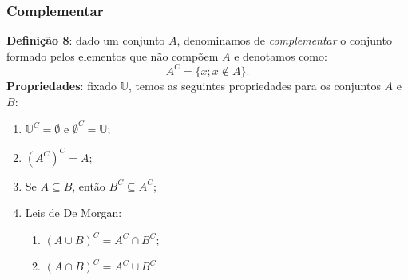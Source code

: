 \documentclass{article}
\begin{document}
\subsubsection{Complementar}
\textbf{Definição 8}: dado um conjunto $A$, denominamos de \emph{complementar} o conjunto formado pelos elementos que não compõem $A$ e denotamos como:
\begin{displaymath}
    A^C = \{x; x \notin A\}.
\end{displaymath}
\textbf{Propriedades}: fixado $\mathbb{U}$, temos as seguintes propriedades para os conjuntos $A$ e $B$:
\begin{enumerate}
    \item $\mathbb{U}^C = \emptyset$ e $\emptyset^C = \mathbb{U}$;
    \item $(A^C)^C = A$;
    \item Se $A \subseteq B$, então $B^C \subseteq A^C$;
    \item Leis de De Morgan:
    \begin{enumerate}
        \item $(A \cup B)^C = A^C \cap B^C$;
        \item $(A \cap B)^C = A^C \cup B^C$
    \end{enumerate}
\end{enumerate}
\end{document}
